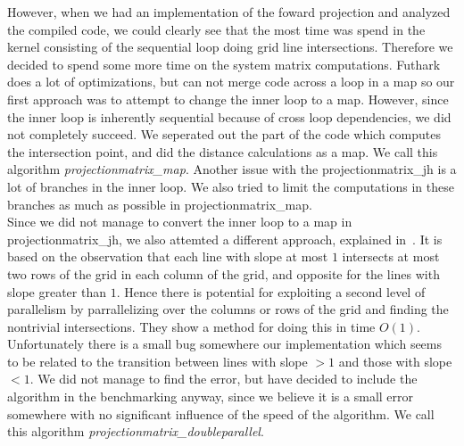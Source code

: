 However, when we had an implementation of the foward projection and analyzed the compiled code, we could clearly see that the most time was spend in the kernel consisting of the sequential loop doing grid line intersections. Therefore we decided to spend some more time on the system matrix computations. Futhark does a lot of optimizations, but can not merge code across a loop in a map so our first approach was to attempt to change the inner loop to a map. However, since the inner loop is inherently sequential because of cross loop dependencies, we did not completely succeed. We seperated out the part of the code which computes the intersection point, and did the distance calculations as a map. We call this algorithm \emph{projectionmatrix\_map}.
Another issue with the projectionmatrix\_jh is a lot of branches in the inner loop. We also tried to limit the computations in these branches as much as possible in projectionmatrix\_map.\\
Since we did not manage to convert the inner loop to a map in projectionmatrix\_jh, we also attemted a different approach, explained in~\cite{Gao2012}. It is based on the observation that each line with slope at most $1$ intersects at most two rows of the grid in each column of the grid, and opposite for the lines with slope greater than $1$. Hence there is potential for exploiting a second level of parallelism by parrallelizing over the columns or rows of the grid and finding the nontrivial intersections. They show a method for doing this in time $O(1)$. Unfortunately there is a small bug somewhere our implementation which seems to be related to the transition between lines with slope $>1$ and those with slope $<1$. We did not manage to find the error, but have decided to include the algorithm in the benchmarking anyway, since we believe it is a small error somewhere with no significant influence of the speed of the algorithm. We call this algorithm \emph{projectionmatrix\_doubleparallel}.\\
